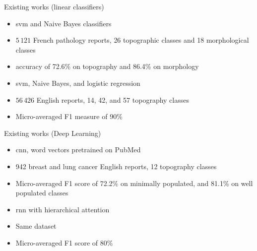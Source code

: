 \begin{frame}{Existing works (linear classifiers)}
  \begin{block}{\footnotesize{}}
    \begin{itemize}
      \footnotesize
    \item \acs{svm} and Naive Bayes classifiers
    \item \alert{$5\,121$} French pathology reports, \alert{26}
      topographic classes and \alert{18} morphological classes 
    \item accuracy of \alert{72.6\%} on topography and \alert{86.4\%} on morphology
    \end{itemize}
  \end{block}
  \begin{block}{\footnotesize{}}
    \begin{itemize}
      \footnotesize
    \item \acs{svm}, Naive Bayes, and logistic regression
    \item \alert{$56\,426$} English reports, \alert{14}, \alert{42}, and \alert{57} topography classes
    \item Micro-averaged F1 measure of \alert{90\%}
    \end{itemize}
  \end{block}
\end{frame}

\begin{frame}{Existing works (Deep Learning)}
  \begin{block}{\footnotesize{}}
    \begin{itemize}
      \footnotesize
    \item \alert{\acs{cnn}}, \alert{word vectors} pretrained on 
      PubMed
    \item \alert{942} breast and lung cancer English
      reports, \alert{12} topography classes
    \item Micro-averaged F1 score of \alert{72.2\%} on minimally
      populated, and \alert{81.1\%} on well populated classes
    \end{itemize}
  \end{block}
  \begin{block}{\footnotesize{}}
    \begin{itemize}
      \footnotesize
    \item \alert{\acs{rnn}} with hierarchical attention
    \item \alert{Same} dataset
    \item Micro-averaged F1 score of \alert{80\%}
    \end{itemize}
  \end{block}
\end{frame}

